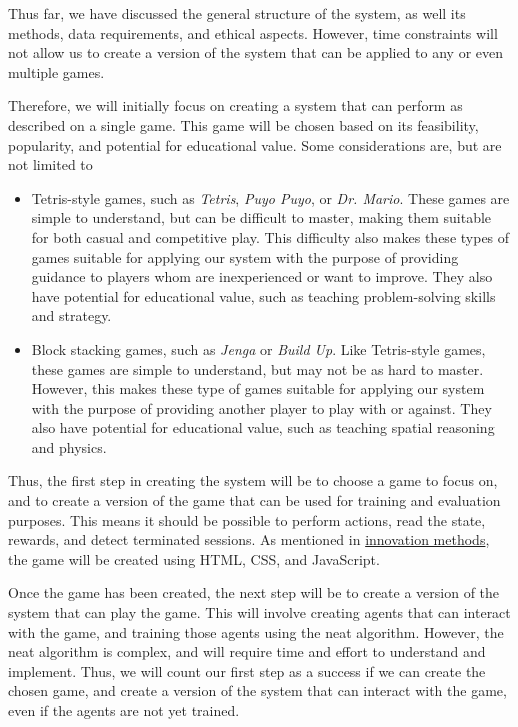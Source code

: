 Thus far, we have discussed the general structure of the system, as well its
methods, data requirements, and ethical aspects. However, time constraints 
will not allow us to create a version of the system that can be applied to
any or even multiple games.

Therefore, we will initially focus on creating a system that can perform
as described on a single game. This game will be chosen based on its
feasibility, popularity, and potential for educational value. Some
considerations are, but are not limited to
\begin{itemize}
    \item Tetris-style games, such as \textit{Tetris}, \textit{Puyo Puyo},
    or \textit{Dr. Mario}. These games are simple to understand, but can be
    difficult to master, making them suitable for both casual and competitive
    play. This difficulty also makes these types of games suitable for applying
    our system with the purpose of providing guidance to players whom are
    inexperienced or want to improve. They also have potential for educational
    value, such as teaching problem-solving skills and strategy.
    \item Block stacking games, such as \textit{Jenga} or \textit{Build Up}.
    Like Tetris-style games, these games are simple to understand, but may not
    be as hard to master. However, this makes these type of games suitable for
    applying our system with the purpose of providing another player to play
    with or against. They also have potential for educational value, such as
    teaching spatial reasoning and physics.
\end{itemize}

Thus, the first step in creating the system will be to choose a game to focus
on, and to create a version of the game that can be used for training and
evaluation purposes. This means it should be possible to perform actions,
read the state, rewards, and detect terminated sessions. As mentioned in
\hyperref[sec:innovation-methods]{innovation methods}, the game will be created
using HTML, CSS, and JavaScript.

Once the game has been created, the next step will be to create a version of
the system that can play the game. This will involve creating agents that can
interact with the game, and training those agents using the \gls{neat}
algorithm. However, the \gls{neat} algorithm is complex, and will require
time and effort to understand and implement. Thus, we will count our first
step as a success if we can create the chosen game, and create a version of
the system that can interact with the game, even if the agents are not yet
trained.
